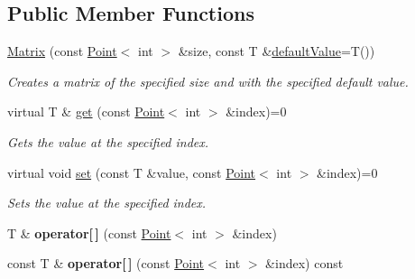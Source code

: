 \subsection*{Public Member Functions}
\begin{DoxyCompactItemize}
\item 
\hyperlink{classrepast_1_1_matrix_a65c52c43c430b1a78c56c006b4559ce3}{Matrix} (const \hyperlink{classrepast_1_1_point}{Point}$<$ int $>$ \&size, const T \&\hyperlink{classrepast_1_1_matrix_ab7d7c37233ead4a6a68feaf344b3ff38}{default\-Value}=T())
\begin{DoxyCompactList}\small\item\em Creates a matrix of the specified size and with the specified default value. \end{DoxyCompactList}\item 
\hypertarget{classrepast_1_1_matrix_a865d67868c32af9e4944c84431ec29a2}{virtual T \& \hyperlink{classrepast_1_1_matrix_a865d67868c32af9e4944c84431ec29a2}{get} (const \hyperlink{classrepast_1_1_point}{Point}$<$ int $>$ \&index)=0}\label{classrepast_1_1_matrix_a865d67868c32af9e4944c84431ec29a2}

\begin{DoxyCompactList}\small\item\em Gets the value at the specified index. \end{DoxyCompactList}\item 
\hypertarget{classrepast_1_1_matrix_a5c7735a078a35f0b9deca407e546ab55}{virtual void \hyperlink{classrepast_1_1_matrix_a5c7735a078a35f0b9deca407e546ab55}{set} (const T \&value, const \hyperlink{classrepast_1_1_point}{Point}$<$ int $>$ \&index)=0}\label{classrepast_1_1_matrix_a5c7735a078a35f0b9deca407e546ab55}

\begin{DoxyCompactList}\small\item\em Sets the value at the specified index. \end{DoxyCompactList}\item 
\hypertarget{classrepast_1_1_matrix_a9cb528d30b1d646d6ca742c3b76a9285}{T \& {\bfseries operator\mbox{[}$\,$\mbox{]}} (const \hyperlink{classrepast_1_1_point}{Point}$<$ int $>$ \&index)}\label{classrepast_1_1_matrix_a9cb528d30b1d646d6ca742c3b76a9285}

\item 
\hypertarget{classrepast_1_1_matrix_a63932af327a9cb1e0501dc183fc034b3}{const T \& {\bfseries operator\mbox{[}$\,$\mbox{]}} (const \hyperlink{classrepast_1_1_point}{Point}$<$ int $>$ \&index) const }\label{classrepast_1_1_matrix_a63932af327a9cb1e0501dc183fc034b3}


\end{DoxyCompactItemize}
